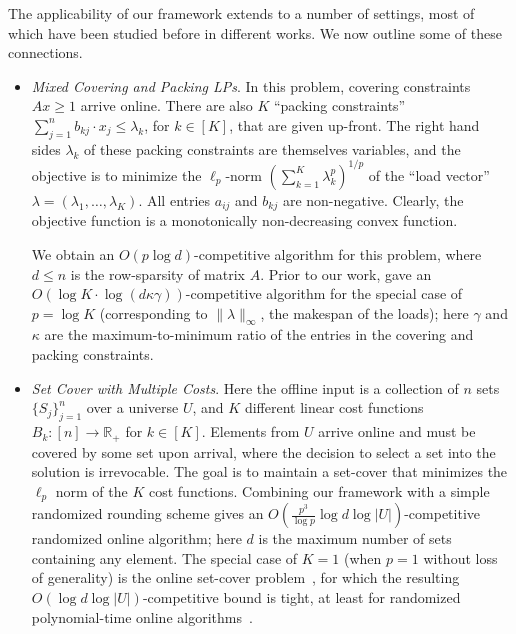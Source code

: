 \documentclass[letterpaper,11pt]{article}
\begin{document}
\def\b{b}  
The applicability of our framework extends to a number of settings,
most of which have been studied before in different works. We now
outline some of these connections.
\begin{itemize}
\item {\em Mixed Covering and Packing LPs}. In this problem, covering constraints $Ax\ge 1$ arrive online. There are also $K$ ``packing constraints'' $\sum_{j=1}^n \b_{kj}\cdot x_j \le \lambda_k$, for $k\in [K]$, that are given up-front. The right hand sides $\lambda_k$ of these packing constraints are themselves variables, and the objective is to minimize the $\ell_p$-norm $(\sum_{k=1}^K \lambda_k^p)^{1/p}$ of the ``load vector'' $\lambda = (\lambda_1, \ldots, \lambda_K)$. All entries $a_{ij}$ and $\b_{kj}$ are non-negative.
    Clearly, the objective function is a monotonically non-decreasing convex function.


  We obtain an $O(p\log d)$-competitive algorithm for this problem,
  where $d\le n$ is the row-sparsity of matrix $A$. Prior to our work,
  \cite{ABFP13} gave an $O(\log K\cdot \log (d\kappa
  \gamma))$-competitive algorithm for the special case of $p=\log K$
  (corresponding to $\| \lambda \|_\infty$, the makespan of the
  loads); here $\gamma$ and $\kappa$ are the maximum-to-minimum ratio of the
  entries in the covering and packing constraints.

\item {\em Set Cover with Multiple Costs}.
Here the offline input is a
  collection of $n$ sets $\{S_j\}_{j=1}^n$ over a universe $U$, and
  $K$ different linear  cost functions $B_k:[n]\rightarrow \mathbb{R}_+$ for
  $k\in [K]$. Elements from $U$ arrive online and must be covered by
  some set upon arrival, where the decision to select a set into the
  solution is irrevocable. The goal is to maintain a set-cover that
  minimizes the $\ell_p$ norm of the $K$ cost functions. Combining our
  framework with a simple randomized rounding scheme gives an
  $O(\frac{p^3}{\log p}\log d\log |U|)$-competitive
  randomized online
  algorithm; here $d$ is the maximum number of sets containing any
  element. The special case of $K=1$ (when $p=1$ without loss of generality)
  is the online set-cover problem~\cite{AAABN03}, for which the
  resulting $O(\log d \log |U|)$-competitive bound is tight, at least for
  randomized polynomial-time online algorithms~\cite{Korman05}.


\end{itemize}
\end{document}
